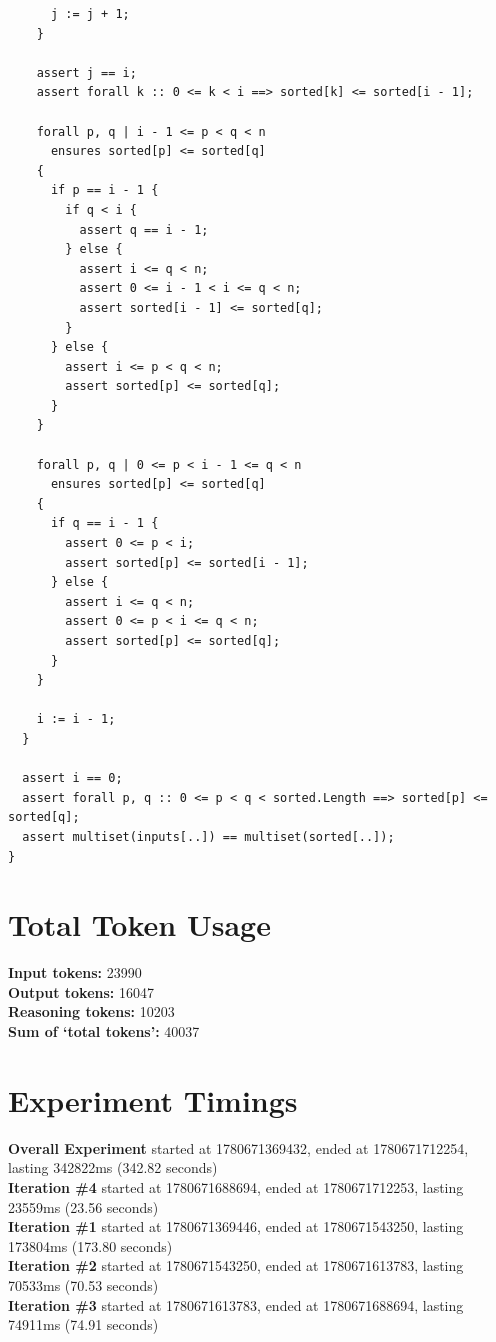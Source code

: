 \documentclass{article}
\begin{document}
\begin{lstlisting}
      j := j + 1;
    }

    assert j == i;
    assert forall k :: 0 <= k < i ==> sorted[k] <= sorted[i - 1];

    forall p, q | i - 1 <= p < q < n
      ensures sorted[p] <= sorted[q]
    {
      if p == i - 1 {
        if q < i {
          assert q == i - 1;
        } else {
          assert i <= q < n;
          assert 0 <= i - 1 < i <= q < n;
          assert sorted[i - 1] <= sorted[q];
        }
      } else {
        assert i <= p < q < n;
        assert sorted[p] <= sorted[q];
      }
    }

    forall p, q | 0 <= p < i - 1 <= q < n
      ensures sorted[p] <= sorted[q]
    {
      if q == i - 1 {
        assert 0 <= p < i;
        assert sorted[p] <= sorted[i - 1];
      } else {
        assert i <= q < n;
        assert 0 <= p < i <= q < n;
        assert sorted[p] <= sorted[q];
      }
    }

    i := i - 1;
  }

  assert i == 0;
  assert forall p, q :: 0 <= p < q < sorted.Length ==> sorted[p] <= sorted[q];
  assert multiset(inputs[..]) == multiset(sorted[..]);
}
\end{lstlisting}
\section*{Total Token Usage}
\textbf{Input tokens: }23990
\\\textbf{Output tokens: }16047
\\\textbf{Reasoning tokens: }10203
\\\textbf{Sum of `total tokens': }40037
\section*{Experiment Timings}
\textbf{Overall Experiment} started at 1780671369432, ended at 1780671712254, lasting 342822ms (342.82 seconds)
\\\textbf{Iteration \#4} started at 1780671688694, ended at 1780671712253, lasting 23559ms (23.56 seconds)
\\\textbf{Iteration \#1} started at 1780671369446, ended at 1780671543250, lasting 173804ms (173.80 seconds)
\\\textbf{Iteration \#2} started at 1780671543250, ended at 1780671613783, lasting 70533ms (70.53 seconds)
\\\textbf{Iteration \#3} started at 1780671613783, ended at 1780671688694, lasting 74911ms (74.91 seconds)
\end{document}
